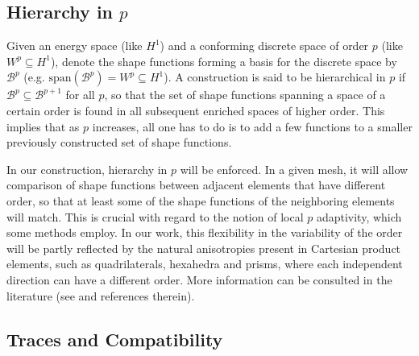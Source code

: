 \subsection{Hierarchy in \texorpdfstring{$p$}{p}}

Given an energy space (like $H^1$) and a conforming discrete space of order $p$ (like $W^p\subseteq H^1$), denote the shape functions forming a basis for the discrete space by $\mathcal{B}^p$ (e.g. $\mathrm{span}(\mathcal{B}^p)=W^p\subseteq H^1$). 
A construction is said to be hierarchical in $p$ if $\mathcal{B}^p\subseteq\mathcal{B}^{p+1}$ for all $p$, so that the set of shape functions spanning a space of a certain order is found in all subsequent enriched spaces of higher order.
This implies that as $p$ increases, all one has to do is to add a few functions to a smaller previously constructed set of shape functions.


In our construction, hierarchy in $p$ will be enforced. 
In a given mesh, it will allow comparison of shape functions between adjacent elements that have different order, so that at least some of the shape functions of the neighboring elements will match.
This is crucial with regard to the notion of local $p$ adaptivity, which some methods employ.
In our work, this flexibility in the variability of the order will be partly reflected by the natural anisotropies present in Cartesian product elements, such as quadrilaterals, hexahedra and prisms, where each independent direction can have a different order.
More information can be consulted in the literature (see \citet{hpbook2} and references therein).


\subsection{Traces and Compatibility}
\label{sec:compatibility}

